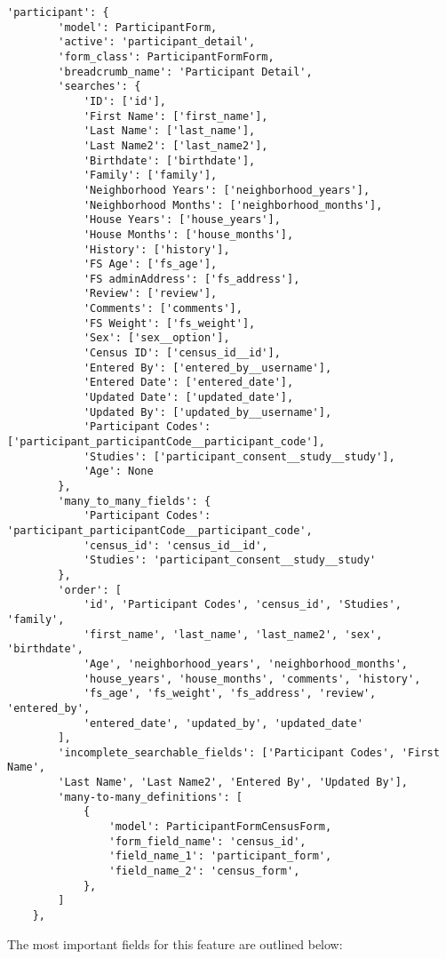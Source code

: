 \documentclass{article}
\begin{document}
\begin{verbatim}
'participant': {
        'model': ParticipantForm,
        'active': 'participant_detail',
        'form_class': ParticipantFormForm,
        'breadcrumb_name': 'Participant Detail',
        'searches': {
            'ID': ['id'],
            'First Name': ['first_name'],
            'Last Name': ['last_name'],
            'Last Name2': ['last_name2'],
            'Birthdate': ['birthdate'],
            'Family': ['family'],
            'Neighborhood Years': ['neighborhood_years'],
            'Neighborhood Months': ['neighborhood_months'],
            'House Years': ['house_years'],
            'House Months': ['house_months'],
            'History': ['history'],
            'FS Age': ['fs_age'],
            'FS adminAddress': ['fs_address'],
            'Review': ['review'],
            'Comments': ['comments'],
            'FS Weight': ['fs_weight'],
            'Sex': ['sex__option'],
            'Census ID': ['census_id__id'],
            'Entered By': ['entered_by__username'],
            'Entered Date': ['entered_date'],
            'Updated Date': ['updated_date'],
            'Updated By': ['updated_by__username'],
            'Participant Codes': ['participant_participantCode__participant_code'],
            'Studies': ['participant_consent__study__study'],
            'Age': None
        },
        'many_to_many_fields': {
            'Participant Codes': 'participant_participantCode__participant_code',
            'census_id': 'census_id__id',
            'Studies': 'participant_consent__study__study'
        },
        'order': [
            'id', 'Participant Codes', 'census_id', 'Studies', 'family', 
            'first_name', 'last_name', 'last_name2', 'sex', 'birthdate', 
            'Age', 'neighborhood_years', 'neighborhood_months', 
            'house_years', 'house_months', 'comments', 'history', 
            'fs_age', 'fs_weight', 'fs_address', 'review', 'entered_by', 
            'entered_date', 'updated_by', 'updated_date'
        ],
        'incomplete_searchable_fields': ['Participant Codes', 'First Name', 
        'Last Name', 'Last Name2', 'Entered By', 'Updated By'],
        'many-to-many_definitions': [
            {
                'model': ParticipantFormCensusForm,
                'form_field_name': 'census_id',
                'field_name_1': 'participant_form',
                'field_name_2': 'census_form',
            },
        ]
    },
\end{verbatim}
The most important fields for this feature are outlined below:
\end{document}
